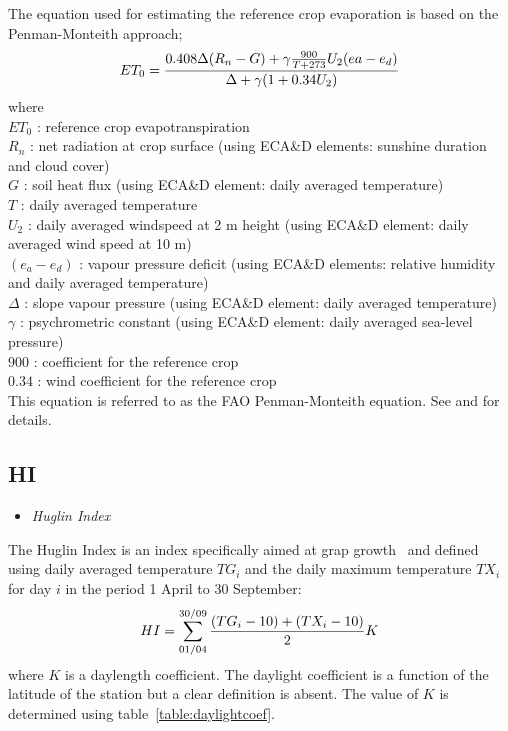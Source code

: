 \documentclass[a4paper,11pt]{article}
\begin{document}
The equation used for estimating the reference crop evaporation is based on the Penman-Monteith approach;
\begin{equation}
ET_0 = \frac{0.408 \Delta (R_n - G) + \gamma {\frac{900}{T + 273}} U_2 ( ea - e_d)}{\Delta + \gamma ( 1 + 0.34 U_2) } \notag
\end{equation}
where\\
$ET_0$ : reference crop evapotranspiration\\
$R_n$ : net radiation at crop surface (using ECA\&D elements: sunshine duration and cloud cover)\\
$G$ : soil heat flux (using ECA\&D element: daily averaged temperature)\\
$T$ : daily averaged temperature\\
$U_2$ : daily averaged windspeed at 2 m height (using ECA\&D element: daily averaged wind speed at 10 m)\\
$(e_a - e_d)$ : vapour pressure deficit (using ECA\&D elements: relative humidity and daily averaged temperature) \\
$\Delta$ : slope vapour pressure (using ECA\&D element: daily averaged temperature)\\
$\gamma$ : psychrometric constant (using ECA\&D element: daily averaged sea-level pressure)\\
$900$ : coefficient for the reference crop\\
$0.34$ : wind coefficient for the reference crop\\
This equation is referred to as the FAO Penman-Monteith equation. See \citet{allen:94a} and \citet{allen:94b}
for details.

\subsection*{HI}
\begin{itemize}
\item \textit{Huglin Index}
\end{itemize}
The Huglin Index is an index specifically aimed at grap growth~\citep{huglin:78} and defined 
using daily averaged temperature $TG_i$ and the daily maximum
temperature $TX_i$ for day $i$ in the period 1 April to 30 September:
\begin{equation}
HI = \sum_{01/04}^{30/09} \frac{(TG_i - 10) + (TX_i- 10)}{2} K \notag
\end{equation}
where $K$ is a daylength coefficient. The daylight coefficient is a function of the latitude of the station
but a  clear definition is absent. The value of $K$ is determined using table~\ref{table:daylightcoef}.
\end{document}
